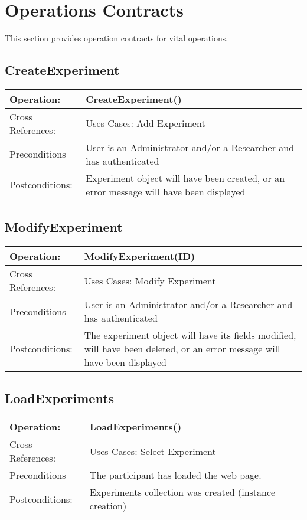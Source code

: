 \section{Operations Contracts}
This section provides operation contracts for vital operations.

\subsection{CreateExperiment}
\begin{tabular}{|l|l|}
\hline Operation: & CreateExperiment() \\ 
\hline Cross References: & Uses Cases: Add Experiment \\ 
\hline Preconditions & User is an Administrator and/or a Researcher and has authenticated \\ 
\hline Postconditions: & Experiment object will have been created, or an error message will have been displayed \\
\hline 
\end{tabular}

\subsection{ModifyExperiment}
\begin{tabular}{|l|l|}
\hline Operation: & ModifyExperiment(ID) \\ 
\hline Cross References: & Uses Cases: Modify Experiment \\ 
\hline Preconditions & User is an Administrator and/or a Researcher and has authenticated \\ 
\hline Postconditions: & The experiment object will have its fields modified, will have been deleted, or an error message will have been displayed \\
\hline 
\end{tabular}

\subsection{LoadExperiments}
\begin{tabular}{|l|l|}
\hline Operation: & LoadExperiments() \\ 
\hline Cross References: & Uses Cases: Select Experiment \\ 
\hline Preconditions & The participant has loaded the web page. \\ 
\hline Postconditions: & Experiments collection was created (instance creation) \\
\hline 
\end{tabular}

